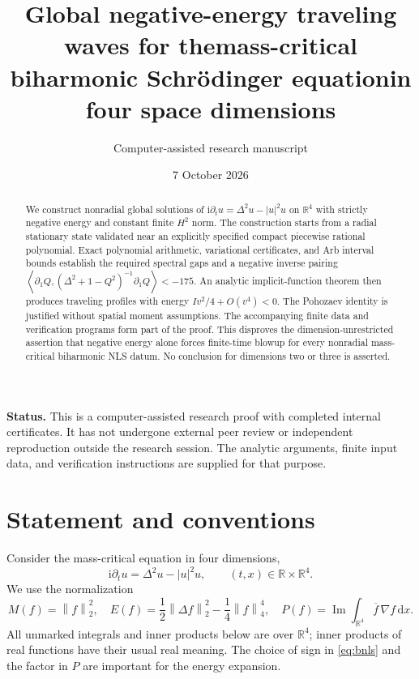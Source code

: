\documentclass[11pt,a4paper]{article}
\title{Global negative-energy traveling waves for the\newline mass-critical biharmonic Schr\"odinger equation\newline in four space dimensions}
\author{Computer-assisted research manuscript}
\date{7 October 2026}
\theoremstyle{definition}\newtheorem{definition}[theorem]{Definition}
\theoremstyle{remark}\newtheorem{remark}[theorem]{Remark}
\newcommand{\R}{\mathbb R}
\newcommand{\ii}{\mathrm i}
\newcommand{\dd}{\,\mathrm d}
\newcommand{\norm}[1]{\left\|#1\right\|}
\newcommand{\ip}[2]{\left\langle #1,#2\right\rangle}
\newcommand{\Ima}{\operatorname{Im}}
\begin{document}
\maketitle
\begin{abstract}
We construct nonradial global solutions of
\(\ii\partial_tu=\Delta^2u-|u|^2u\) on \(\R^4\) with strictly negative energy and constant finite \(H^2\) norm. The construction starts from a radial stationary state validated near an explicitly specified compact piecewise rational polynomial. Exact polynomial arithmetic, variational certificates, and Arb interval bounds establish the required spectral gaps and a negative inverse pairing
\(\ip{\partial_1Q}{(\Delta^2+1-Q^2)^{-1}\partial_1Q}<-175\).
An analytic implicit-function theorem then produces traveling profiles with energy \(Iv^2/4+O(v^4)<0\). The Pohozaev identity is justified without spatial moment assumptions. The accompanying finite data and verification programs form part of the proof. This disproves the dimension-unrestricted assertion that negative energy alone forces finite-time blowup for every nonradial mass-critical biharmonic NLS datum. No conclusion for dimensions two or three is asserted.
\end{abstract}
\noindent\textbf{Status.} This is a computer-assisted research proof with completed internal certificates. It has not undergone external peer review or independent reproduction outside the research session. The analytic arguments, finite input data, and verification instructions are supplied for that purpose.

\section{Statement and conventions}

Consider the mass-critical equation in four dimensions,
\begin{equation}\label{eq:bnls}
 \ii\partial_tu=\Delta^2u-|u|^2u,
 \qquad (t,x)\in\R\times\R^4.
\end{equation}
We use the normalization
\begin{equation}\label{eq:conserved}
 M(f)=\norm f_2^2,\quad
 E(f)=\frac12\norm{\Delta f}_2^2-\frac14\norm f_4^4,
 \quad P(f)=\Ima\int_{\R^4}\overline f\,\nabla f\dd x.
\end{equation}
All unmarked integrals and inner products below are over \(\R^4\); inner products of real functions have their usual real meaning. The choice of sign in \eqref{eq:bnls} and the factor in \(P\) are important for the energy expansion.
\end{document}

